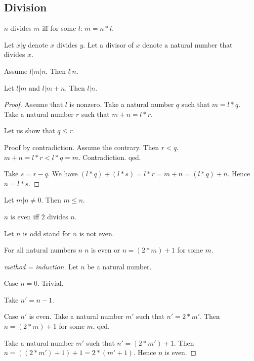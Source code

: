 \documentclass[11pt]{article}
\begin{document}
\subsection{Division}

\begin{forthel}

\begin{definition}
$n$ divides $m$ iff for some $l$: $m = n * l$.
\end{definition}

Let $x | y$ denote $x$ divides $y$.
Let a divisor of $x$ denote a natural number that divides $x$.

\begin{lemma}
Assume $l | m | n$.
Then $l | n$.
\end{lemma}

\begin{lemma}
Let $l | m$ and $l | m + n$.
Then $l | n$.
\end{lemma}
\begin{proof}
Assume that $l$ is nonzero.
Take a natural number $q$ such that $m = l * q$.
Take a natural number $r$ such that $m + n = l * r$.

Let us show that
$q \leq r$.

Proof by contradiction.
Assume the contrary. Then $r < q$.
$m+n = l * r < l * q = m$.
Contradiction. qed.

Take $s = r - q$.
We have $(l * q) + (l * s) = l * r = m + n = (l * q) + n$.
Hence $n = l * s$.
\end{proof}

\begin{lemma}
Let $m | n \neq 0$.
Then $m \leq n$.
\end{lemma}

\begin{definition} $n$ is even iff $2$ divides $n$.
\end{definition}

Let $n$ is odd stand for $n$ is not even.

\begin{lemma}
For all natural numbers $n$ $n$ is even or $n = (2 * m) + 1$ for some $m$.
\end{lemma}
\begin{proof}[method = induction]
Let $n$ be a natural number.

Case $n = 0$. Trivial.

Take $n' = n - 1$.

Case $n'$ is even. Take a natural number $m'$ such that $n' = 2 * m'$.
Then $n = (2 * m) + 1$ for some $m$. qed.

Take a natural number $m'$ such that $n' = (2 * m') + 1$.
Then $n = ((2 * m') + 1) + 1 = 2 * (m' + 1)$.
Hence $n$ is even.

\end{proof}

\end{forthel}
\end{document}
